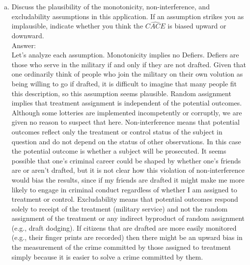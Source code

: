 \documentclass[11pt,notitlepage]{article}\usepackage[]{graphicx}\usepackage[]{color}
\begin{document}
\begin{enumerate}[a)]
\item Discuss the plausibility of the monotonicity, non-interference, and excludability assumptions in this application. If an assumption strikes you as implausible, indicate whether you think the $\widehat{CACE}$ is biased upward or downward. \\
Answer:\\
Let's analyze each assumption. Monotonicity implies no Defiers. Defiers are those who serve in the military if and only if they are not drafted. Given that one ordinarily think of people who join the military on their own volution as being willing to go if drafted, it is difficult to imagine that many people fit this description, so this assumption seems plausible. Random assignment implies that treatment assignment is independent of the potential outcomes. Although some lotteries are implemented incompetently or corruptly, we are given no reason to suspect that here. Non-interference means that potential outcomes reflect only the treatment or control status of the subject in question and do not depend on the status of other observations. In this case the potential outcome is whether a subject will be prosecuted. It seems possible that one's criminal career could be shaped by whether one's friends are or aren't drafted, but it is not clear how this violation of non-interference would bias the results, since if my friends are drafted it might make me more likely to engage in criminal conduct regardless of whether I am assigned to treatment or control. Excludability means that potential outcomes respond solely to receipt of the treatment (military service) and not the random assignment of the treatment or any indirect byproduct of random assignment (e.g., draft dodging). If citizens that are drafted are more easily monitored (e.g., their finger prints are recorded) then there might be an upward bias in the measurement of the crime committed by those assigned to treatment simply because it is easier to solve a crime committed by them. 
\end{enumerate}
\end{document}
